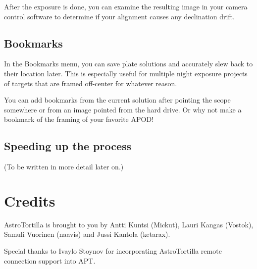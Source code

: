 \documentclass[english]{article}
\begin{document}
After the exposure is done, you can examine the resulting image in your camera 
control software to determine if your alignment causes any declination drift.

\subsection{Bookmarks}

In the Bookmarks menu, you can save plate solutions and accurately slew back to their location later. 
This is especially useful for multiple night exposure projects of targets that are framed off-center for whatever reason.

You can add bookmarks from the current solution after pointing the scope somewhere or from an image pointed from the hard drive. Or why not make a bookmark of the framing of your favorite APOD!

\subsection{Speeding up the process}

(To be written in more detail later on.)

\newpage

\section{Credits}

AstroTortilla is brought to you by Antti Kuntsi (Mickut), Lauri Kangas (Vostok), Samuli Vuorinen (naavis) and Jussi Kantola (ketarax). 

Special thanks to Ivaylo Stoynov for incorporating AstroTortilla remote connection support into APT.

\end{document}
